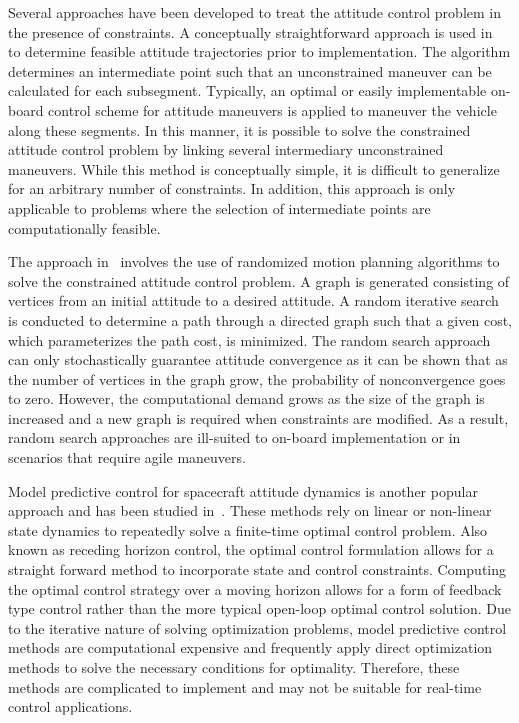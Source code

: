 Several approaches have been developed to treat the attitude control problem in the presence of constraints.
A conceptually straightforward approach is used in~\cite{hablani1999} to determine feasible attitude trajectories prior to implementation.
The algorithm determines an intermediate point such that an unconstrained maneuver can be calculated for each subsegment.
Typically, an optimal or easily implementable on-board control scheme for attitude maneuvers is applied to maneuver the vehicle along these segments.
In this manner, it is possible to solve the constrained attitude control problem by linking several intermediary unconstrained maneuvers.
While this method is conceptually simple, it is difficult to generalize for an arbitrary number of constraints.
In addition, this approach is only applicable to problems where the selection of intermediate points are computationally feasible.

The approach in~\cite{frazzoli2001} involves the use of randomized motion planning algorithms to solve the constrained attitude control problem.
A graph is generated consisting of vertices from an initial attitude to a desired attitude. 
A random iterative search is conducted to determine a path through a directed graph such that a given cost, which parameterizes the path cost, is minimized.
The random search approach can only stochastically guarantee attitude convergence as it can be shown that as the number of vertices in the graph grow, the probability of nonconvergence goes to zero.
However, the computational demand grows as the size of the graph is increased and a new graph is required when constraints are modified. 
As a result, random search approaches are ill-suited to on-board implementation or in scenarios that require agile maneuvers.

Model predictive control for spacecraft attitude dynamics is another popular approach and has been studied in~\cite{guiggiani2014,kalabic2014,gupta2015}.
These methods rely on linear or non-linear state dynamics to repeatedly solve a finite-time optimal control problem.
Also known as receding horizon control, the optimal control formulation allows for a straight forward method to incorporate state and control constraints.
Computing the optimal control strategy over a moving horizon allows for a form of feedback type control rather than the more typical open-loop optimal control solution.
Due to the iterative nature of solving optimization problems, model predictive control methods are computational expensive and frequently apply direct optimization methods to solve the necessary conditions for optimality.
Therefore, these methods are complicated to implement and may not be suitable for real-time control applications.
  
